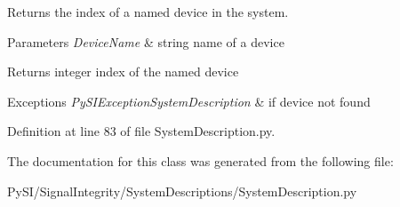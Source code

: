 Returns the index of a named device in the system. 


\begin{DoxyParams}{Parameters}
{\em Device\+Name} & string name of a device \\
\hline
\end{DoxyParams}
\begin{DoxyReturn}{Returns}
integer index of the named device 
\end{DoxyReturn}

\begin{DoxyExceptions}{Exceptions}
{\em Py\+S\+I\+Exception\+System\+Description} & if device not found \\
\hline
\end{DoxyExceptions}


Definition at line 83 of file System\+Description.\+py.



The documentation for this class was generated from the following file\+:\begin{DoxyCompactItemize}
\item 
Py\+S\+I/\+Signal\+Integrity/\+System\+Descriptions/System\+Description.\+py\end{DoxyCompactItemize}
